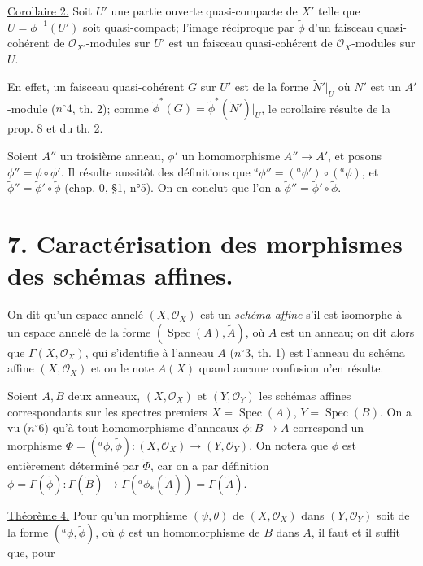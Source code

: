 \noindent \underline{Corollaire 2.} Soit $U'$ une partie ouverte quasi-compacte de $X'$ telle que $U = \phi^{-1}(U')$ soit quasi-compact; l'image réciproque par $\tilde{\phi}$ d'un faisceau quasi-cohérent de $\mathcal{O}_{X'}$-modules sur $U'$ est un faisceau quasi-cohérent de $\mathcal{O}_X$-modules sur $U$.

\noindent En effet, un faisceau quasi-cohérent $G$ sur $U'$ est de la forme $\tilde{N}'|_U$ où $N'$ est un $A'$-module ($n^\circ 4$, th. 2); comme $\tilde{\phi}^*(G) = \tilde{\phi}^*(\tilde{N}')|_U$, le corollaire résulte de la prop. 8 et du th. 2.

\noindent Soient $A''$ un troisième anneau, $\phi'$ un homomorphisme $A'' \to A'$, et posons $\phi'' = \phi \circ \phi'$. Il résulte aussitôt des définitions que ${}^a\phi'' = ({}^a\phi') \circ ({}^a\phi)$, et $\tilde{\phi}'' = \tilde{\phi}' \circ \tilde{\phi}$ (chap. 0, §1, n°5). On en conclut que l'on a $\tilde{\phi}'' = \tilde{\phi}' \circ \tilde{\phi}$.

\section*{7. Caractérisation des morphismes des schémas affines.}

\noindent On dit qu'un espace annelé $(X, \mathcal{O}_X)$ est un \emph{schéma affine} s'il est isomorphe à un espace annelé de la forme $(\operatorname{Spec}(A), \tilde{A})$, où $A$ est un anneau; on dit alors que $\Gamma(X, \mathcal{O}_X)$, qui s'identifie à l'anneau $A$ ($n^\circ 3$, th. 1) est l'anneau du schéma affine $(X, \mathcal{O}_X)$ et on le note $A(X)$ quand aucune confusion n'en résulte.

\noindent Soient $A, B$ deux anneaux, $(X, \mathcal{O}_X)$ et $(Y, \mathcal{O}_Y)$ les schémas affines correspondants sur les spectres premiers $X = \operatorname{Spec}(A)$, $Y = \operatorname{Spec}(B)$. On a vu ($n^\circ 6$) qu'à tout homomorphisme d'anneaux $\phi: B \to A$ correspond un morphisme $\Phi = ({}^a\phi, \tilde{\phi}): (X, \mathcal{O}_X) \to (Y, \mathcal{O}_Y)$. On notera que $\phi$ est entièrement déterminé par $\tilde{\Phi}$, car on a par définition $\phi = \Gamma(\tilde{\phi}): \Gamma(\tilde{B}) \to \Gamma({}^a\phi_*(\tilde{A})) = \Gamma(\tilde{A})$.

\noindent \underline{Théorème 4.} Pour qu'un morphisme $(\psi, \theta)$ de $(X, \mathcal{O}_X)$ dans $(Y, \mathcal{O}_Y)$ soit de la forme $({}^a\phi, \tilde{\phi})$, où $\phi$ est un homomorphisme de $B$ dans $A$, il faut et il suffit que, pour

